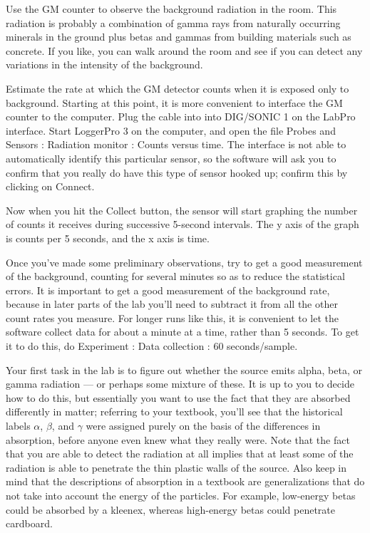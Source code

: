 \observations



Use the GM counter to observe the background radiation in the room. This radiation is
probably a combination of gamma rays from naturally occurring minerals
in the ground plus betas and gammas from building materials such 
as concrete. If you like, you can walk around the room and see if you can detect
any variations in the intensity of the background.

Estimate the rate at which the GM detector counts when it is exposed
only to background. Starting at this point, it is more convenient to
interface the GM counter to the computer. Plug the cable into
into DIG/SONIC 1 on the LabPro interface. Start LoggerPro 3 on the
computer, and open the file Probes and Sensors : Radiation monitor : Counts versus time.
The interface is not able to automatically identify this particular sensor, so
the software will ask you to confirm that you really do have this type of sensor
hooked up; confirm this by clicking on Connect.

Now when you hit the Collect button, the sensor will start graphing the number of counts
it receives during successive 5-second intervals. The y axis of the graph is counts
per 5 seconds, and the x axis is time.

Once you've made some preliminary observations, try to get a good measurement of
the background, counting for several minutes so as to reduce the statistical errors.
It is important to get a good measurement of the background rate, because in later
parts of the lab you'll need to subtract it from all the other count rates you measure.
For longer runs like this, it is convenient to let the software collect data for about a minute
at a time, rather than 5 seconds. To get it to do this, do Experiment : Data collection : 60 seconds/sample.


Your first task in the lab is to figure out whether the source emits
alpha, beta, or gamma radiation --- or perhaps some mixture of these.
It is up to you to decide how to do this, but essentially you want to
use the fact that they are absorbed differently in matter; referring
to your textbook, you'll see that the historical labels $\alpha$, $\beta$, and $\gamma$ were assigned
purely on the basis of the differences in absorption, before anyone even knew what they
really were. Note that the fact that you are able to detect the radiation
at all implies that at least some of the radiation is able to penetrate the thin
plastic walls of the source. Also keep in mind that the descriptions of absorption
in a textbook are generalizations that do not take into account the energy of the
particles. For example, low-energy betas could be absorbed by a kleenex, whereas
high-energy betas could penetrate cardboard.

